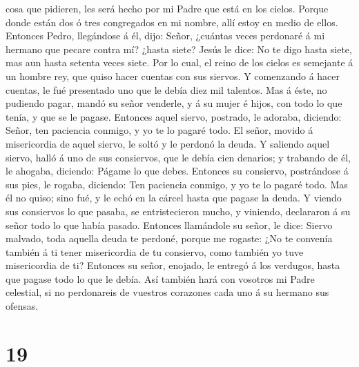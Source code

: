cosa que pidieren, les será hecho por mi Padre que está en los cielos.
 Porque donde están dos ó tres congregados en mi nombre,
allí estoy en medio de ellos.  Entonces Pedro, llegándose
á él, dijo: Señor, ¿cuántas veces perdonaré á mi hermano que pecare
contra mí? ¿hasta siete?  Jesús le dice: No te digo hasta
siete, mas aun hasta setenta veces siete.  Por lo cual,
el reino de los cielos es semejante á un hombre rey, que quiso hacer
cuentas con sus siervos.  Y comenzando á hacer cuentas,
le fué presentado uno que le debía diez mil talentos. 
Mas á éste, no pudiendo pagar, mandó su señor venderle, y á su mujer é
hijos, con todo lo que tenía, y que se le pagase. 
Entonces aquel siervo, postrado, le adoraba, diciendo: Señor, ten
paciencia conmigo, y yo te lo pagaré todo.  El señor,
movido á misericordia de aquel siervo, le soltó y le perdonó la deuda.
 Y saliendo aquel siervo, halló á uno de sus consiervos,
que le debía cien denarios; y trabando de él, le ahogaba, diciendo:
Págame lo que debes.  Entonces su consiervo, postrándose
á sus pies, le rogaba, diciendo: Ten paciencia conmigo, y yo te lo
pagaré todo.  Mas él no quiso; sino fué, y le echó en la
cárcel hasta que pagase la deuda.  Y viendo sus
consiervos lo que pasaba, se entristecieron mucho, y viniendo,
declararon á su señor todo lo que había pasado.  Entonces
llamándole su señor, le dice: Siervo malvado, toda aquella deuda te
perdoné, porque me rogaste:  ¿No te convenía también á ti
tener misericordia de tu consiervo, como también yo tuve misericordia de
ti?  Entonces su señor, enojado, le entregó á los
verdugos, hasta que pagase todo lo que le debía.  Así
también hará con vosotros mi Padre celestial, si no perdonareis de
vuestros corazones cada uno á su hermano sus ofensas.

\hypertarget{section-18}{%
\section{19}\label{section-18}}

